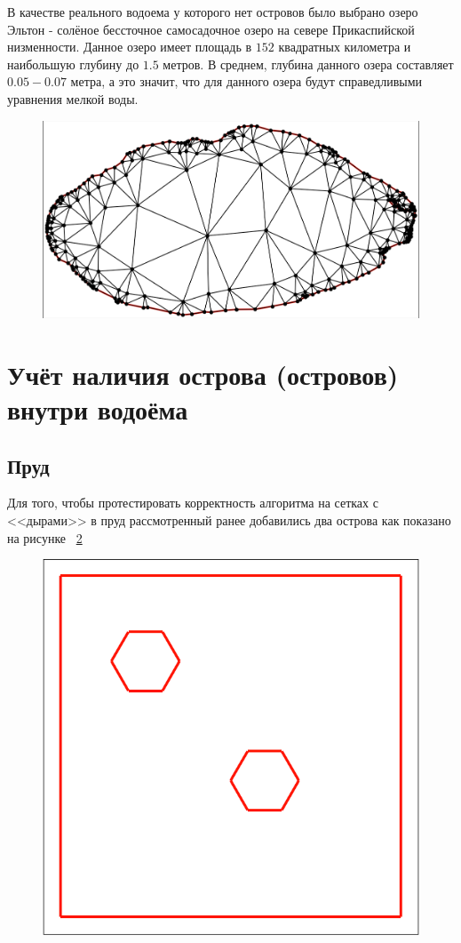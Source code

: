 \documentclass[14pt]{extreport}
\begin{document}
В качестве реального водоема у которого нет островов было выбрано озеро Эльтон - солёное бессточное самосадочное озеро на севере Прикаспийской низменности. Данное озеро имеет площадь в $152$ квадратных километра и наибольшую глубину до $1.5$ метров. В среднем, глубина данного озера составляет $0.05 - 0.07$ метра, а это значит, что для данного озера будут справедливыми уравнения мелкой воды.

\begin{figure}[H]
\centerline{
\includegraphics[width=0.5\linewidth]{images/ex2/mesh}}
\caption{}
\label{img:ex2:mesh}
\end{figure}


\section{Учёт наличия острова (островов) внутри водоёма}


\subsection{Пруд}
Для того, чтобы протестировать корректность алгоритма на сетках с <<дырами>> в пруд рассмотренный ранее добавились два острова как показано на рисунке ~\ref{img:ex3:contour}

\begin{figure}[H]
\centerline{
\includegraphics[width=0.5\linewidth]{images/ex3/contour}}
\caption{}
\label{img:ex3:contour}
\end{figure}
\end{document}
